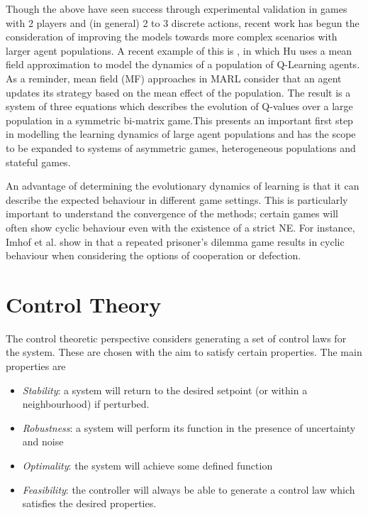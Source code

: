 \documentclass[.../main.tex]{subfiles}
\begin{document}
Though the above have seen success through experimental validation in games with 2 players and (in
general) 2 to 3 discrete actions, recent work has begun the consideration of improving the models
towards more complex scenarios with larger agent populations. A recent example of this is 
\cite{Hu2019}, in which Hu uses a mean field approximation to model the dynamics of a population of
Q-Learning agents. As a reminder, mean field (MF) approaches in MARL consider that an agent updates
its strategy based on the mean effect of the population. The result is a system of three equations
which describes the evolution of Q-values over a large population in a symmetric bi-matrix game.This
presents an important first step in modelling the learning dynamics of large agent populations and
has the scope to be expanded to systems of asymmetric games, heterogeneous populations and stateful
games.

An advantage of determining the evolutionary dynamics of learning is that it can describe the
expected behaviour in different game settings. This is particularly important to understand the
convergence of the methods; certain games will often show cyclic behaviour even with the existence
of a strict NE. For instance, Imhof et al. show in \cite{Imhof2005} that a repeated prisoner's
dilemma game results in cyclic behaviour when considering the options of cooperation or defection.

\section{Control Theory} \label{sec::Control_Theory}

The control theoretic perspective considers generating a set of control laws for the system. These
are chosen with the aim to satisfy certain properties. The main properties are

\begin{itemize}
    \item {\em Stability}: a system will return to the desired setpoint (or within a neighbourhood) if
    perturbed.

    \item {\em Robustness}: a system will perform its function in the presence of uncertainty and
    noise

    \item {\em Optimality}: the system will achieve some defined function 

    \item {\em Feasibility}: the controller will always be able to generate a control law which
    satisfies the desired properties.
\end{itemize}
\end{document}
